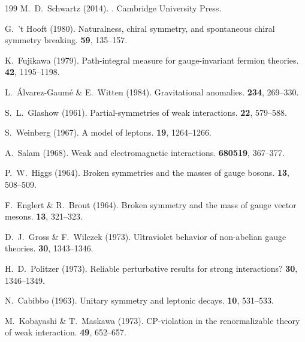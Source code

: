 \documentclass[11pt,a4paper,openright]{book}
\theoremstyle{plain}
\theoremstyle{definition}
\begin{document}
\begin{thebibliography}{199}
M.~D.~Schwartz (2014).
.
\newblock Cambridge University Press.

G.~'t Hooft (1980).
\newblock Naturalness, chiral symmetry, and spontaneous chiral symmetry breaking.
 {\bf 59}, 135--157.

K.~Fujikawa (1979).
\newblock Path-integral measure for gauge-invariant fermion theories.
 {\bf 42}, 1195--1198.

L.~Álvarez-Gaumé \& E.~Witten (1984).
\newblock Gravitational anomalies.
 {\bf 234}, 269--330.


S.~L.~Glashow (1961).
\newblock Partial-symmetries of weak interactions.
 {\bf 22}, 579--588.

S.~Weinberg (1967).
\newblock A model of leptons.
 {\bf 19}, 1264--1266.

A.~Salam (1968).
\newblock Weak and electromagnetic interactions.
 {\bf 680519}, 367--377.

P.~W.~Higgs (1964).
\newblock Broken symmetries and the masses of gauge bosons.
 {\bf 13}, 508--509.

F.~Englert \& R.~Brout (1964).
\newblock Broken symmetry and the mass of gauge vector mesons.
 {\bf 13}, 321--323.

D.~J.~Gross \& F.~Wilczek (1973).
\newblock Ultraviolet behavior of non-abelian gauge theories.
 {\bf 30}, 1343--1346.

H.~D.~Politzer (1973).
\newblock Reliable perturbative results for strong interactions?
 {\bf 30}, 1346--1349.

N.~Cabibbo (1963).
\newblock Unitary symmetry and leptonic decays.
 {\bf 10}, 531--533.

M.~Kobayashi \& T.~Maskawa (1973).
\newblock CP-violation in the renormalizable theory of weak interaction.
 {\bf 49}, 652--657.


\end{thebibliography}
\end{document}
